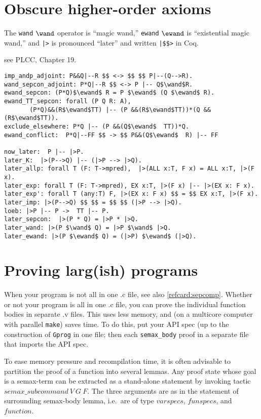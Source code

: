 \documentclass[12pt,fleqn,openany,oneside,showtrims]{memoir}
\begin{document}
\chapter{Obscure higher-order axioms}

The \lstinline{wand} $\wand$ operator is ``magic wand,''
\lstinline{ewand} $\ewand$ is ``existential magic wand,''
and \lstinline{|>} is pronounced ``later''
and written \lstinline{|$$>} in Coq.

see PLCC, Chapter 19.

\begin{lstlisting}
imp_andp_adjoint: P&&Q|--R $$ <-> $$ $$ P|--(Q-->R).
wand_sepcon_adjoint: P*Q|--R $$ <-> P |-- Q$\wand$R.
ewand_sepcon: (P*Q)$\ewand$ R = P $\ewand$ (Q $\ewand$ R).
ewand_TT_sepcon: forall (P Q R: A),
       (P*Q)&&(R$\ewand$TT) |-- (P &&(R$\ewand$TT))*(Q && (R$\ewand$TT)).
exclude_elsewhere: P*Q |-- (P &&(Q$\ewand$  TT))*Q.
ewand_conflict:  P*Q|--FF $$ -> $$ P&&(Q$\ewand$  R) |-- FF

now_later:  P |-- |>P.
later_K:  |>(P-->Q) |-- (|>P --> |>Q).
later_allp: forall T (F: T->mpred),  |>(ALL x:T, F x) = ALL x:T, |>(F x).
later_exp: forall T (F: T->mpred), EX x:T, |>(F x) |-- |>(EX x: F x).
later_exp': forall T (any:T) F, |>(EX x: F x) $$ = $$ EX x:T, |>(F x).
later_imp: |>(P-->Q) $$ $$ = $$ $$ (|>P --> |>Q).
loeb: |>P |-- P ->  TT |-- P.
later_sepcon:  |>(P * Q) = |>P * |>Q.
later_wand: |>(P $\wand$ Q) = |>P $\wand$ |>Q.
later_ewand: |>(P $\ewand$ Q) = (|>P) $\ewand$ (|>Q).
\end{lstlisting}


\chapter{Proving larg(ish) programs}

When your program is not all in one .c file,
see also \autoref{refcard:sepcomp}.
Whether or not your program is all in one .c file,
you can prove the individual function bodies in separate .v files.
This uses less memory, and (on a multicore computer with
parallel \lstinline{make}) saves time.
To do this, put your API spec (up to the construction
of \lstinline{Gprog} in one file;
then each \lstinline{semax_body} proof in a separate file
that imports the API spec.

To ease memory pressure and recompilation time, it is often advisable
to partition the proof of a function into several lemmas. Any proof
state whose goal is a semax-term can be extracted as a stand-alone
statement by invoking tactic $\mathit{semax\_subcommand}\ V\ G\ F$.
The three arguments are as in the statement of surrounding semax-body
lemma, i.e.~are of type $\mathit{varspecs}$, $\mathit{funspecs}$, and
$\mathit{function}$.
\end{document}

